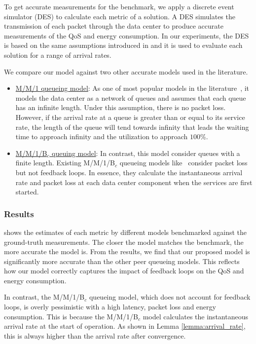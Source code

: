 To get accurate measurements for the benchmark, we apply a discrete event simulator (DES) to calculate each metric of a solution. A DES simulates the transmission of each packet through the data center to produce accurate measurements of the QoS and energy consumption. In our experiments, the DES is based on the same assumptions introduced in  and it is used to evaluate each solution for a range of arrival rates.

We compare our model against two other accurate models used in the literature.%
\begin{itemize}
    \item \underline{M/M/1 queueing model}: As one of most popular models in the literature~\cite{PeiHXLWW20,JemaaPP16,BaumgartnerRB15}, it models the data center as a network of queues and assumes that each queue has an infinite length. Under this assumption, there is no packet loss. However, if the arrival rate at a queue is greater than or equal to its service rate, the length of the queue will tend towards infinity that leads the waiting time to approach infinity and the utilization to approach $100$\%.
    \item \underline{M/M/1/B$_c$ queuing model}: In contrast, this model consider queues with a finite length. Existing M/M/1/B$_c$ queueing models like~\cite{ChuaWZSH16} consider packet loss but not feedback loops. In essence, they calculate the instantaneous arrival rate and packet loss at each data center component when the services are first started.
\end{itemize}

\subsubsection{Results}
 shows the estimates of each metric by different models benchmarked against the ground-truth measurements. The closer the model matches the benchmark, the more accurate the model is. From the results, we find that our proposed model is significantly more accurate than the other peer queueing models. This reflects how our model correctly captures the impact of feedback loops on the QoS and energy consumption.

In contrast, the M/M/1/B$_c$ queueing model, which does not account for feedback loops, is overly pessimistic with a high latency, packet loss and energy consumption. This is because the M/M/1/B$_c$ model calculates the instantaneous arrival rate at the start of operation. As shown in Lemma \ref{lemma:arrival_rate}, this is always higher than the arrival rate after convergence.

